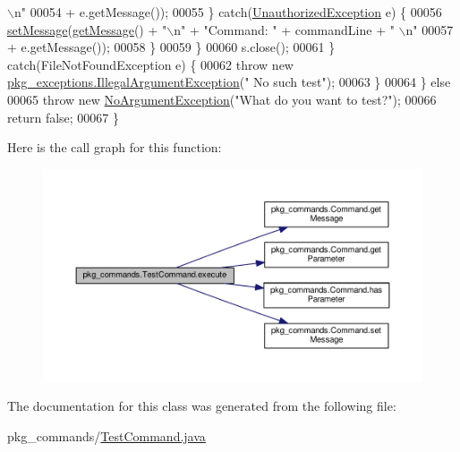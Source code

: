 \begin{DoxyCode}
{      \(\backslash\)n"}
00054                                 + e.getMessage());
00055                     \} \textcolor{keywordflow}{catch}(\hyperlink{classpkg__exceptions_1_1UnauthorizedException}{UnauthorizedException} e)  \{
00056                         \hyperlink{classpkg__commands_1_1Command_ae210ff216fe908b111ba1c988a963d13}{setMessage}(\hyperlink{classpkg__commands_1_1Command_ac2a42e2bab264821892daefaf9a18b6c}{getMessage}() + \textcolor{stringliteral}{"\(\backslash\)n"} + \textcolor{stringliteral}{"Command: "} + commandLine + \textcolor{stringliteral}{"
      \(\backslash\)n"}
00057                                 + e.getMessage());
00058                     \}
00059                 \}
00060                 s.close();
00061             \} \textcolor{keywordflow}{catch}(FileNotFoundException e) \{
00062                 \textcolor{keywordflow}{throw} \textcolor{keyword}{new} \hyperlink{classpkg__exceptions_1_1IllegalArgumentException}{pkg\_exceptions.IllegalArgumentException}(\textcolor{stringliteral}{"
      No such test"});
00063             \}
00064         \} \textcolor{keywordflow}{else}
00065             \textcolor{keywordflow}{throw} \textcolor{keyword}{new} \hyperlink{classpkg__exceptions_1_1NoArgumentException}{NoArgumentException}(\textcolor{stringliteral}{"What do you want to test?"});
00066         \textcolor{keywordflow}{return} \textcolor{keyword}{false};
00067     \}
\end{DoxyCode}


Here is the call graph for this function\-:\nopagebreak
\begin{figure}[H]
\begin{center}
\leavevmode
\includegraphics[width=350pt]{classpkg__commands_1_1TestCommand_a1ff07c27a46910d20c2e4569888892ca_cgraph}
\end{center}
\end{figure}




The documentation for this class was generated from the following file\-:\begin{DoxyCompactItemize}
\item 
pkg\-\_\-commands/\hyperlink{TestCommand_8java}{Test\-Command.\-java}\end{DoxyCompactItemize}
